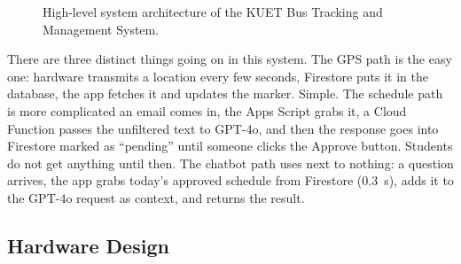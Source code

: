 \documentclass[12pt,a4paper]{report}
\begin{document}
\begin{figure}[t]
{}
\caption{High-level system architecture of the KUET Bus Tracking and Management System.}
\label{fig:arch}
\end{figure}

There are three distinct things going on in this system. The GPS path is the easy one: hardware transmits a location every few seconds, Firestore puts it in the database, the app fetches it and updates the marker. Simple. The schedule path is more complicated an email comes in, the Apps Script grabs it, a Cloud Function passes the unfiltered text to GPT-4o, and then the response goes into Firestore marked as ``pending'' until someone clicks the Approve button. Students do not get anything until then. The chatbot path uses next to nothing: a question arrives, the app grabs today's approved schedule from Firestore (0.3~s), adds it to the GPT-4o request as context, and returns the result.

\subsection{Hardware Design}
\end{document}
